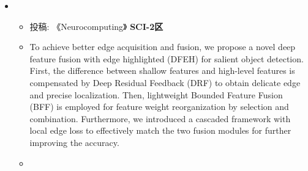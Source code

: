   \begin{itemize}[leftmargin=*]
    \item
      {\small
      \begin{itemize}
        \item 投稿: 《Neurocomputing》 \qquad \textbf{SCI-2区} 
        \item To achieve better edge
        acquisition and fusion, we propose a novel deep feature fusion with edge highlighted (DFEH) for salient
        object detection. First, the difference between shallow features and high-level features is compensated
        by Deep Residual Feedback (DRF) to obtain delicate edge and precise localization. Then, lightweight
        Bounded Feature Fusion (BFF) is employed for feature weight reorganization by selection and combination.
        Furthermore, we introduced a cascaded framework with local edge loss to effectively match the two fusion
        modules for further improving the accuracy.
        \item\begin{table}
        	\centering
        	\caption{ Benchmark score of 16 the latest leading RGB-SOD methods on 5 classical datasets. $**$ denotes the method uses the corresponding dataset as the training set. Red and green highlight the top two performances. The overall ranking (the sum of ranks) represents the total ranking in a particular metric for each approach. The top-1 scores with different backbones are marked with {\textcolor[rgb]{ 0,  0,  1}{\textbf{belu}}} and {\textcolor[rgb]{ 1,  0,  0}{\textbf{red}}}. }
\end{table}
\end{itemize}}
\end{itemize}
